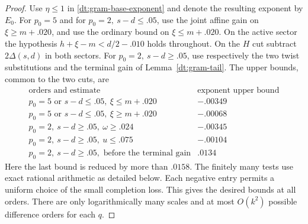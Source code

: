 \documentclass[11pt,a4paper]{article}
\theoremstyle{paperplain}
\numberwithin{equation}{section}
\begin{document}
\begin{proof}
Use \(\eta\le1\) in \eqref{dt:gram-base-exponent}
and denote the resulting exponent by \(E_0\).
For \(p_0=5\) and for \(p_0=2,\ s-d\le.05\), use the
joint affine gain on \(\xi\ge m+.020\), and use the
ordinary bound on \(\xi\le m+.020\).
On the active sector the hypothesis
\(h+\xi-m<d/2-.010\) holds throughout.
On the \(H\) cut subtract \(2\Delta(s,d)\) in both
sectors. For \(p_0=2,\ s-d\ge.05\), use respectively
the two twist substitutions and the terminal gain
of Lemma~\ref{dt:gram-tail}. The upper bounds, common
to the two cuts, are
\[
\begin{array}{l|r}
 \text{orders and estimate} & \text{exponent upper bound}\\ \hline
 p_0=5\text{ or }s-d\le .05,\ \xi\le m+.020 & -.00349\\
 p_0=5\text{ or }s-d\le .05,\ \xi\ge m+.020 & -.00068\\
 p_0=2,\ s-d\ge .05,\ \omega\ge.024 & -.00345\\
 p_0=2,\ s-d\ge .05,\ u\le.075 & -.00104\\
 p_0=2,\ s-d\ge .05,\text{ before the terminal gain} & .0134
\end{array}
\]
Here the last bound is reduced by more than \(.0158\).
The finitely many tests use exact rational arithmetic
as detailed below. Each negative entry permits a
uniform choice of the small completion loss.
This gives the desired bounds at all orders.
There are only logarithmically many scales and at most
\(O(k^2)\) possible difference orders for each \(q\).
\end{proof}
\end{document}
